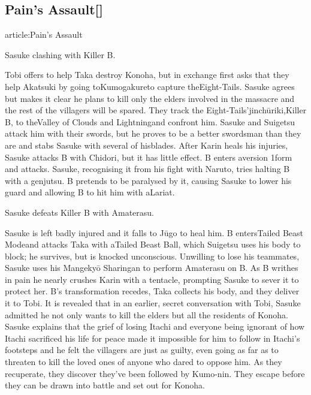 \documentclass[a4paper,12pt]{article}
\begin{document}
\subsection*{Pain's Assault[]}\n\nMain article:Pain's Assault\\ \par \vspace{0.5cm}

Sasuke clashing with Killer B.\\ \par \vspace{0.5cm}

Tobi offers to help Taka destroy Konoha, but in exchange first asks that they help Akatsuki by going toKumogakureto capture theEight-Tails. Sasuke agrees but makes it clear he plans to kill only the elders involved in the massacre and the rest of the villagers will be spared. They track the Eight-Tails'jinchūriki,Killer B, to theValley of Clouds and Lightningand confront him. Sasuke and Suigetsu attack him with their swords, but he proves to be a better swordsman than they are and stabs Sasuke with several of hisblades. After Karin heals his injuries, Sasuke attacks B with Chidori, but it has little effect. B enters aversion 1form and attacks. Sasuke, recognising it from his fight with Naruto, tries halting B with a genjutsu. B pretends to be paralysed by it, causing Sasuke to lower his guard and allowing B to hit him with aLariat.\\ \par \vspace{0.5cm}

Sasuke defeats Killer B with Amaterasu.\\ \par \vspace{0.5cm}

Sasuke is left badly injured and it falls to Jūgo to heal him. B entersTailed Beast Modeand attacks Taka with aTailed Beast Ball, which Suigetsu uses his body to block; he survives, but is knocked unconscious. Unwilling to lose his teammates, Sasuke uses his Mangekyō Sharingan to perform Amaterasu on B. As B writhes in pain he nearly crushes Karin with a tentacle, prompting Sasuke to sever it to protect her. B's transformation recedes, Taka collects his body, and they deliver it to Tobi. It is revealed that in an earlier, secret conversation with Tobi, Sasuke admitted he not only wants to kill the elders but all the residents of Konoha. Sasuke explains that the grief of losing Itachi and everyone being ignorant of how Itachi sacrificed his life for peace made it impossible for him to follow in Itachi's footsteps and he felt the villagers are just as guilty, even going as far as to threaten to kill the loved ones of anyone who dared to oppose him. As they recuperate, they discover they've been followed by Kumo-nin. They escape before they can be drawn into battle and set out for Konoha.\\ \par \vspace{0.5cm}
\end{document}
